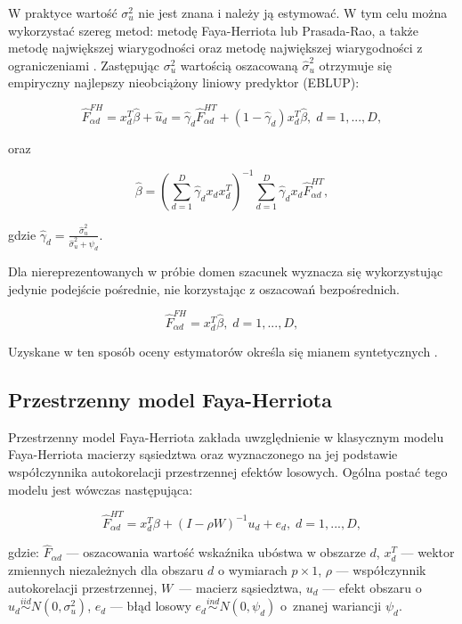 W praktyce wartość $\sigma_u^2$ nie jest znana i należy ją estymować. W tym celu można wykorzystać szereg metod: metodę Faya-Herriota lub Prasada-Rao, a także metodę największej wiarygodności oraz metodę największej wiarygodności z ograniczeniami \citep{prasad1990}. Zastępując $\sigma_u^2$ wartością oszacowaną $\hat{\sigma}^2_u$ otrzymuje się empiryczny najlepszy nieobciążony liniowy predyktor (EBLUP):

\begin{equation}
\hat{F}_{\alpha d}^{FH}=x_d^{T}\hat{\beta} + \hat{u}_d = \hat{\gamma}_d\hat{F}_{\alpha d}^{HT} + (1-\hat{\gamma}_d)x_d^{T}\hat{\beta},\; d=1, ..., D,
\end{equation}

oraz 

\begin{equation}
\hat{\beta}=\left(\sum\limits_{d=1}^{D}{\hat{\gamma}_d x_d x_d^T}\right)^{-1}\sum\limits_{d=1}^{D}{\hat{\gamma}_d x_d \hat{F}_{\alpha d}^{HT}},
\end{equation}

gdzie $\hat{\gamma}_d=\frac{\hat{\sigma}^2_u}{\hat{\sigma}^2_u+\psi_d}$.

Dla niereprezentowanych w próbie domen szacunek wyznacza się wykorzystując jedynie podejście pośrednie, nie korzystając z oszacowań bezpośrednich.

\begin{equation}
\hat{F}_{\alpha d}^{FH}=x_d^{T}\hat{\beta},\; d=1, ..., D,
\end{equation}

Uzyskane w ten sposób oceny estymatorów określa się mianem syntetycznych \citep{rao2015}.

\subsection{Przestrzenny model Faya-Herriota}

Przestrzenny model Faya-Herriota \citep{pratesi2008} zakłada uwzględnienie w klasycznym modelu Faya-Herriota macierzy sąsiedztwa oraz wyznaczonego na jej podstawie współczynnika autokorelacji przestrzennej efektów losowych. Ogólna postać tego modelu jest wówczas następująca:

\begin{equation}
\hat{F}_{\alpha d}^{HT}=x_d^{T}\beta + (I-\rho W)^{-1}u_d + e_d,\; d=1, ..., D,
\end{equation}

gdzie: $\hat{F}_{\alpha d}$ --- oszacowania wartość wskaźnika ubóstwa w obszarze $d$, $x_d^{T}$ --- wektor zmiennych niezależnych dla obszaru $d$ o wymiarach $p \times 1$, $\rho$ --- współczynnik autokorelacji przestrzennej, $W$~--- macierz sąsiedztwa, $u_d$ --- efekt obszaru o $u_d\stackrel{iid}{\sim}N(0,\sigma^2_u)$, $e_d$ --- błąd losowy $e_d\stackrel{ind}{\sim}N(0,\psi_d)$ o~znanej wariancji $\psi_d$.

